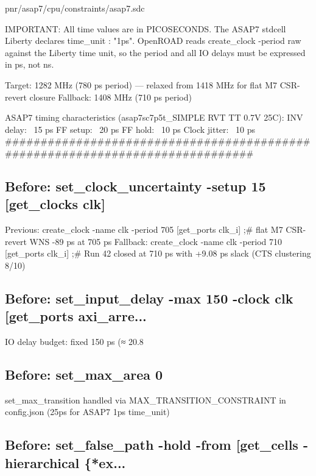 \begin{relocated}{pnr/asap7/cpu/constraints/asap7.sdc}
\begin{textblock}
IMPORTANT: All time values are in PICOSECONDS.
The ASAP7 stdcell Liberty declares  time_unit : "1ps".
OpenROAD reads create_clock -period raw against the Liberty time unit, so
the period and all IO delays must be expressed in ps, not ns.

Target:  1282 MHz (780 ps period) — relaxed from 1418 MHz for flat M7 CSR-revert closure
Fallback: 1408 MHz (710 ps period)

ASAP7 timing characteristics (asap7sc7p5t_SIMPLE RVT TT 0.7V 25C):
  INV delay:      ~15 ps
  FF setup:       ~20 ps
  FF hold:        ~10 ps
  Clock jitter:   ~10 ps
##############################################################################
\end{textblock}

\subsection*{Before: set\_clock\_uncertainty -setup 15 [get\_clocks clk]}

\begin{textblock}
Previous: create_clock -name clk -period 705 [get_ports clk_i]  ;# flat M7 CSR-revert WNS -89 ps at 705 ps
Fallback: create_clock -name clk -period 710 [get_ports clk_i]  ;# Run 42 closed at 710 ps with +9.08 ps slack (CTS clustering 8/10)
\end{textblock}

\subsection*{Before: set\_input\_delay  -max 150 -clock clk [get\_ports axi\_arre...}

\begin{textblock}
IO delay budget: fixed 150 ps (≈ 20.8%
\end{textblock}

\subsection*{Before: set\_max\_area       0}

\begin{textblock}
set_max_transition handled via MAX_TRANSITION_CONSTRAINT in config.json (25ps for ASAP7 1ps time_unit)
\end{textblock}

\subsection*{Before: set\_false\_path -hold -from [get\_cells -hierarchical \{*ex...}


\end{relocated}
